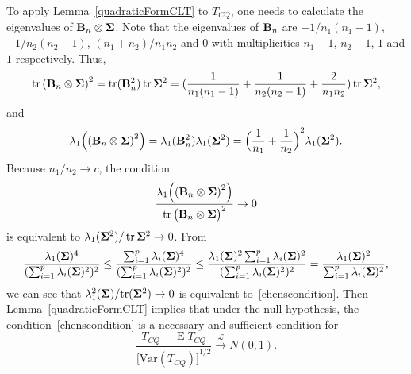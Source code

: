 \documentclass[review]{elsarticle}
\DeclareMathOperator{\mytr}{tr}
\DeclareMathOperator{\myE}{E}
\theoremstyle{plain}
\theoremstyle{definition}
\theoremstyle{remark}
\begin{document}
To apply Lemma~\ref{quadraticFormCLT} to $T_{CQ}$, one needs to calculate the eigenvalues of $\mathbf{B}_n\otimes \boldsymbol{\Sigma}$.
    Note that the eigenvalues of $\mathbf{B}_n$ are $-1/n_1(n_1-1)$, $-1/n_2(n_2-1)$, $(n_1+n_2)/n_1 n_2$ and $0$ with multiplicities $n_1-1$, $n_2-1$, $1$ and $1$ respectively.
    Thus,
    \begin{equation*}
        \mytr{(\BB_n\otimes \bSigma)}^2=\mytr(\BB_n^2)\mytr\bSigma^2=(\frac{1}{n_1(n_1-1)}+\frac{1}{n_2(n_2-1)}+\frac{2}{n_1 n_2})\mytr\bSigma^2,
    \end{equation*}
and
    \begin{equation*}
        \lambda_{1}\Big({(\mathbf{B}_n\otimes \boldsymbol{\Sigma})}^2\Big)=\lambda_{1}(\mathbf{B}_n^2)\lambda_{1}(\boldsymbol{\Sigma}^2)={\Big(\frac{1}{n_1}+\frac{1}{n_2}\Big)}^2\lambda_{1}(\boldsymbol{\Sigma}^2).
    \end{equation*}
    Because $n_1/n_2\to c$, the condition
    $$
         \frac{\lambda_{1}\Big({(\BB_n\otimes \bSigma)}^2\Big)}{
\mytr{\big(\BB_n\otimes \bSigma\big)}^2}
         \to 0
    $$
     is equivalent to $\lambda_{1}(\bSigma^2)/\mytr\bSigma^2\to 0$.
From
$$
\frac{\lambda_1(\boldsymbol{\Sigma})^4}{(\sum_{i=1}^p \lambda_i(\boldsymbol{\Sigma})^2)^2}
\leq
\frac{\sum_{i=1}^p\lambda_i(\boldsymbol{\Sigma})^4}{(\sum_{i=1}^p \lambda_i(\boldsymbol{\Sigma})^2)^2}
\leq
\frac{\lambda_1(\boldsymbol{\Sigma})^2\sum_{i=1}^p\lambda_i(\boldsymbol{\Sigma})^2}{(\sum_{i=1}^p \lambda_i(\boldsymbol{\Sigma})^2)^2}
=
\frac{\lambda_1(\boldsymbol{\Sigma})^2}{\sum_{i=1}^p \lambda_i(\boldsymbol{\Sigma})^2},
$$
    we can see that ${\lambda_{1}^2(\boldsymbol{\Sigma})}/{\mathrm{tr}(\boldsymbol{\Sigma}^2)}\to 0$  is equivalent to~\eqref{chenscondition}.
Then Lemma~\ref{quadraticFormCLT} implies that under the null hypothesis, the condition~\eqref{chenscondition} is a necessary and sufficient condition for 
    \begin{equation*}
        \frac{T_{CQ}-\myE T_{CQ}}{{\big[\mathrm{Var}(T_{CQ})\big]}^{1/2}}\xrightarrow{\mathcal{L}}N(0,1).
    \end{equation*}
\end{document}
